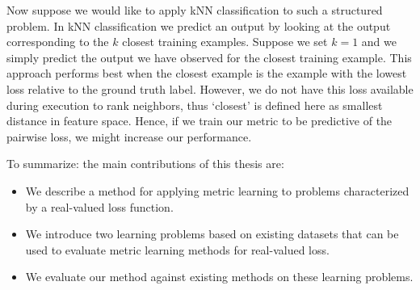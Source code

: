 Now suppose we would like to apply \acf{kNN} classification to such a structured problem. In \ac{kNN} classification we predict an output by looking at the output corresponding to the $k$ closest training examples. Suppose we set $k = 1$ and we simply predict the output we have observed for the closest training example. This approach performs best when the closest example is the example with the lowest loss relative to the ground truth label. However, we do not have this loss available during execution to rank neighbors, thus `closest' is defined here as smallest distance in feature space. Hence, if we train our metric to be predictive of the pairwise loss, we might increase our performance.


To summarize: the main contributions of this thesis are:
\begin{itemize}
\item We describe a method for applying metric learning to problems characterized by a real-valued loss function.
\item We introduce two learning problems based on existing datasets that can be used to evaluate metric learning methods for real-valued loss.
\item We evaluate our method against existing methods on these learning problems.
\end{itemize}
